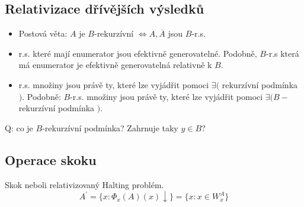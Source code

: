 \subsection{Relativizace dřívějších výsledků}

\begin{observation}\label{rel_prop}
\begin{itemize}
	\item Postová věta:
		$A$ je $B$-rekurzívní $\iff A, \overline{A}$ jsou $B$-r.s.
	\item r.s. které mají enumerator jsou efektivně generovatelné.
		Podobně, $B$-r.s která má enumerator je efektivně generovatelná relativně k $B$.
	\item r.s. množiny jsou právě ty, které lze vyjádřit pomoci $\exists ($ rekurzívní podmínka $)$.
		Podobně: $B$-r.s. množiny jsou právě ty, které lze vyjádřit pomoci $\exists (B-$rekurzívní podmínka $)$.
\end{itemize}
\end{observation}

Q: co je $B$-rekurzívní podmínka? Zahrnuje taky $y \in B$?

\subsection{Operace skoku}

\begin{definition}[Jump]\label{jump}
	Skok neboli relativizovaný Halting problém.
	\[ A^{\prime} = \{ x: \Phi_x(A)(x) \downarrow \} = \{ x: x \in W_x^A \} \]
\end{definition}

